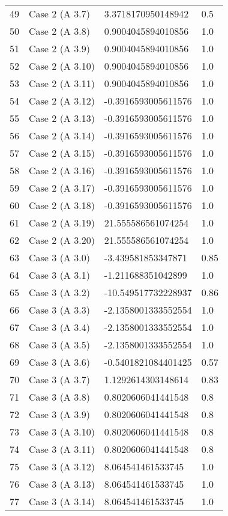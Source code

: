 \begin{tabularx}{\textwidth}{lXXX}
49 & Case 2 (A 3.7) & 3.3718170950148942 & 0.5 \\
50 & Case 2 (A 3.8) & 0.9004045894010856 & 1.0 \\
51 & Case 2 (A 3.9) & 0.9004045894010856 & 1.0 \\
52 & Case 2 (A 3.10) & 0.9004045894010856 & 1.0 \\
53 & Case 2 (A 3.11) & 0.9004045894010856 & 1.0 \\
54 & Case 2 (A 3.12) & -0.3916593005611576 & 1.0 \\
55 & Case 2 (A 3.13) & -0.3916593005611576 & 1.0 \\
56 & Case 2 (A 3.14) & -0.3916593005611576 & 1.0 \\
57 & Case 2 (A 3.15) & -0.3916593005611576 & 1.0 \\
58 & Case 2 (A 3.16) & -0.3916593005611576 & 1.0 \\
59 & Case 2 (A 3.17) & -0.3916593005611576 & 1.0 \\
60 & Case 2 (A 3.18) & -0.3916593005611576 & 1.0 \\
61 & Case 2 (A 3.19) & 21.555586561074254 & 1.0 \\
62 & Case 2 (A 3.20) & 21.555586561074254 & 1.0 \\
63 & Case 3 (A 3.0) & -3.439581853347871 & 0.85 \\
64 & Case 3 (A 3.1) & -1.211688351042899 & 1.0 \\
65 & Case 3 (A 3.2) & -10.549517732228937 & 0.86 \\
66 & Case 3 (A 3.3) & -2.1358001333552554 & 1.0 \\
67 & Case 3 (A 3.4) & -2.1358001333552554 & 1.0 \\
68 & Case 3 (A 3.5) & -2.1358001333552554 & 1.0 \\
69 & Case 3 (A 3.6) & -0.5401821084401425 & 0.57 \\
70 & Case 3 (A 3.7) & 1.1292614303148614 & 0.83 \\
71 & Case 3 (A 3.8) & 0.8020606041441548 & 0.8 \\
72 & Case 3 (A 3.9) & 0.8020606041441548 & 0.8 \\
73 & Case 3 (A 3.10) & 0.8020606041441548 & 0.8 \\
74 & Case 3 (A 3.11) & 0.8020606041441548 & 0.8 \\
75 & Case 3 (A 3.12) & 8.064541461533745 & 1.0 \\
76 & Case 3 (A 3.13) & 8.064541461533745 & 1.0 \\
77 & Case 3 (A 3.14) & 8.064541461533745 & 1.0 \\

\end{tabularx}

